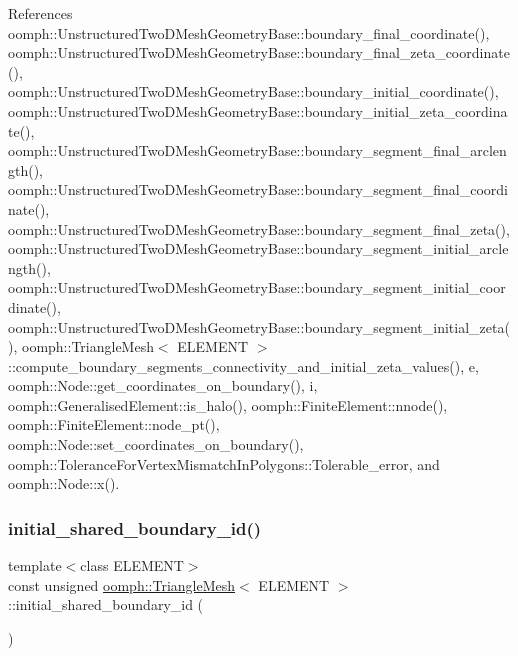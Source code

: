 References oomph\+::\+Unstructured\+Two\+D\+Mesh\+Geometry\+Base\+::boundary\+\_\+final\+\_\+coordinate(), oomph\+::\+Unstructured\+Two\+D\+Mesh\+Geometry\+Base\+::boundary\+\_\+final\+\_\+zeta\+\_\+coordinate(), oomph\+::\+Unstructured\+Two\+D\+Mesh\+Geometry\+Base\+::boundary\+\_\+initial\+\_\+coordinate(), oomph\+::\+Unstructured\+Two\+D\+Mesh\+Geometry\+Base\+::boundary\+\_\+initial\+\_\+zeta\+\_\+coordinate(), oomph\+::\+Unstructured\+Two\+D\+Mesh\+Geometry\+Base\+::boundary\+\_\+segment\+\_\+final\+\_\+arclength(), oomph\+::\+Unstructured\+Two\+D\+Mesh\+Geometry\+Base\+::boundary\+\_\+segment\+\_\+final\+\_\+coordinate(), oomph\+::\+Unstructured\+Two\+D\+Mesh\+Geometry\+Base\+::boundary\+\_\+segment\+\_\+final\+\_\+zeta(), oomph\+::\+Unstructured\+Two\+D\+Mesh\+Geometry\+Base\+::boundary\+\_\+segment\+\_\+initial\+\_\+arclength(), oomph\+::\+Unstructured\+Two\+D\+Mesh\+Geometry\+Base\+::boundary\+\_\+segment\+\_\+initial\+\_\+coordinate(), oomph\+::\+Unstructured\+Two\+D\+Mesh\+Geometry\+Base\+::boundary\+\_\+segment\+\_\+initial\+\_\+zeta(), oomph\+::\+Triangle\+Mesh$<$ E\+L\+E\+M\+E\+N\+T $>$\+::compute\+\_\+boundary\+\_\+segments\+\_\+connectivity\+\_\+and\+\_\+initial\+\_\+zeta\+\_\+values(), e, oomph\+::\+Node\+::get\+\_\+coordinates\+\_\+on\+\_\+boundary(), i, oomph\+::\+Generalised\+Element\+::is\+\_\+halo(), oomph\+::\+Finite\+Element\+::nnode(), oomph\+::\+Finite\+Element\+::node\+\_\+pt(), oomph\+::\+Node\+::set\+\_\+coordinates\+\_\+on\+\_\+boundary(), oomph\+::\+Tolerance\+For\+Vertex\+Mismatch\+In\+Polygons\+::\+Tolerable\+\_\+error, and oomph\+::\+Node\+::x().

\mbox{\label{classoomph_1_1TriangleMesh_a27de848116b11c6fdd3dde35dcd0ca54}} 
\subsubsection{\texorpdfstring{initial\+\_\+shared\+\_\+boundary\+\_\+id()}{initial\_shared\_boundary\_id()}}
{\footnotesize\ttfamily template$<$class E\+L\+E\+M\+E\+NT$>$ \\
const unsigned \hyperlink{classoomph_1_1TriangleMesh}{oomph\+::\+Triangle\+Mesh}$<$ E\+L\+E\+M\+E\+NT $>$\+::initial\+\_\+shared\+\_\+boundary\+\_\+id (\begin{DoxyParamCaption}{ }\end{DoxyParamCaption})\hspace{0.3cm}{\ttfamily [inline]}}



